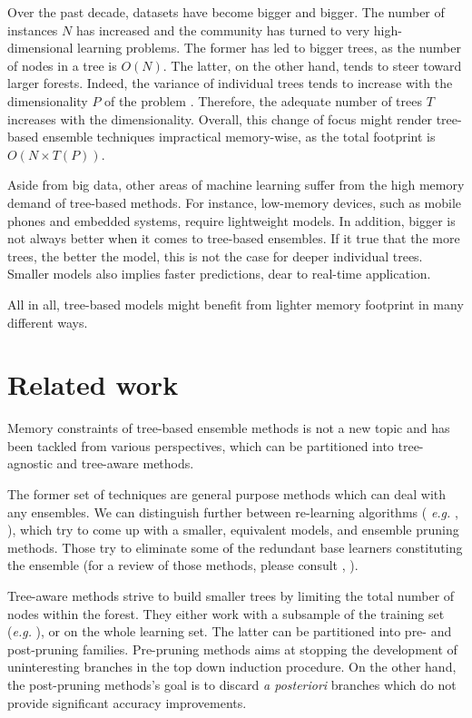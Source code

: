 \documentclass{article}
\begin{document}
Over the past decade, datasets have become bigger and bigger. The number of 
instances $N$ has increased and the community has turned to very 
high-dimensional learning problems. The former has led to bigger trees, as the 
number of nodes in a tree is $O(N)$. The latter, on the other hand, tends to 
steer toward larger forests. Indeed, the variance of individual trees tends to 
increase with the dimensionality $P$ of the problem \cite{l1basedcomp}. 
Therefore, the adequate number of trees $T$ increases with the dimensionality. 
Overall, this change of focus might render tree-based ensemble techniques 
impractical memory-wise, as the total footprint is $O(N \times T(P))$. 

Aside from big data, other areas of machine learning suffer from the high 
memory demand of tree-based methods. For instance, low-memory devices, such as 
mobile phones and embedded systems, require lightweight models. In addition, 
bigger is not always better when it comes to tree-based ensembles.
If it true that the more trees, the better the model, this is not the case for 
deeper individual trees.
Smaller models also implies faster predictions, dear to real-time application.

All in all, tree-based models might benefit from lighter memory footprint in 
many different ways.


\section{Related work}
\label{sec:relatedWork}
Memory constraints of tree-based ensemble methods is not a new topic and has 
been tackled from various perspectives, which can be partitioned into 
tree-agnostic and tree-aware methods.

The former set of techniques are general purpose methods which can deal with  
any ensembles. We can distinguish further between re-learning algorithms ({\it 
e.g.} \citet{domingos1997oracle}, \citet{menke2009oracle}), which try to come 
up with a smaller, equivalent models, and ensemble pruning methods. Those try 
to eliminate some of the redundant base learners constituting the ensemble (for 
a review of those methods, please consult \citet{tsoumakas2008enspruning}, 
\citet{rokach2016enspruning}). 

Tree-aware methods strive to build smaller trees by limiting the total number 
of nodes within the forest. They either work with a subsample of the training 
set ({\it e.g.} \citet{breiman1999pasting}), or on the whole learning set. The 
latter can be partitioned into pre- and post-pruning families. 
Pre-pruning methods aims at stopping the development of uninteresting branches 
in the top down induction procedure. On the other hand, the post-pruning 
methods's goal is to discard {\it a posteriori} branches which do not provide 
significant accuracy improvements.
\end{document}
